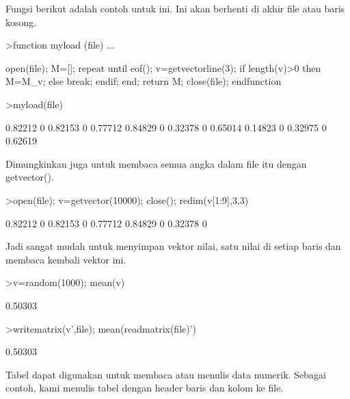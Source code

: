 \documentclass{article}
\begin{document}
\begin{eulernotebook}
\begin{eulercomment}
\begin{eulercomment}
\begin{eulercomment}
Fungsi berikut adalah contoh untuk ini. Ini akan berhenti di akhir
file atau baris kosong.
\end{eulercomment}
\begin{eulerprompt}
>function myload (file) ...
\end{eulerprompt}
\begin{eulerudf}
  open(file);
  M=[];
  repeat
     until eof();
     v=getvectorline(3);
     if length(v)>0 then M=M_v; else break; endif;
  end;
  return M;
  close(file);
  endfunction
\end{eulerudf}
\begin{eulerprompt}
>myload(file)
\end{eulerprompt}
\begin{euleroutput}
    0.82212         0   0.82153         0   0.77712 
    0.84829         0   0.32378         0   0.65014 
    0.14823         0   0.32975         0   0.62619 
\end{euleroutput}
\begin{eulercomment}
Dimungkinkan juga untuk membaca semua angka dalam file itu dengan
getvector().
\end{eulercomment}
\begin{eulerprompt}
>open(file); v=getvector(10000); close(); redim(v[1:9],3,3)
\end{eulerprompt}
\begin{euleroutput}
    0.82212         0   0.82153 
          0   0.77712   0.84829 
          0   0.32378         0 
\end{euleroutput}
\begin{eulercomment}
Jadi sangat mudah untuk menyimpan vektor nilai, satu nilai di setiap
baris dan membaca kembali vektor ini.
\end{eulercomment}
\begin{eulerprompt}
>v=random(1000); mean(v)
\end{eulerprompt}
\begin{euleroutput}
  0.50303
\end{euleroutput}
\begin{eulerprompt}
>writematrix(v',file); mean(readmatrix(file)')
\end{eulerprompt}
\begin{euleroutput}
  0.50303
\end{euleroutput}
\begin{eulercomment}
Tabel dapat digunakan untuk membaca atau menulis data numerik. Sebagai
contoh, kami menulis tabel dengan header baris dan kolom ke file.

\end{eulercomment}
\end{eulercomment}
\end{eulercomment}
\end{eulernotebook}
\end{document}
